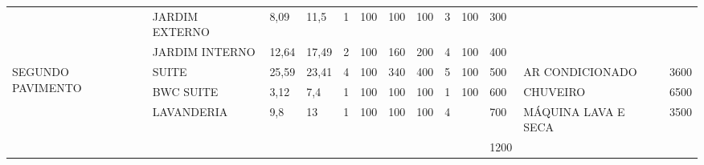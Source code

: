 \begin{table}[H]
{\begin{tabular}{|l|l|ll|llll|lll|ll|}
		& JARDIM EXTERNO               & \multicolumn{1}{l|}{8,09}                   & 11,5                   & \multicolumn{1}{l|}{1}                  & \multicolumn{1}{l|}{100}                  & \multicolumn{1}{l|}{100}                  & 100                  & \multicolumn{1}{l|}{3}                  & \multicolumn{1}{l|}{100}                  & 300                   & \multicolumn{1}{l|}{}                     &          \\ \cline{2-13} 
		& JARDIM INTERNO               & \multicolumn{1}{l|}{12,64}                  & 17,49                  & \multicolumn{1}{l|}{2}                  & \multicolumn{1}{l|}{100}                  & \multicolumn{1}{l|}{160}                  & 200                  & \multicolumn{1}{l|}{4}                  & \multicolumn{1}{l|}{100}                  & 400                   & \multicolumn{1}{l|}{}                     &          \\ \hline
		\multirow{13}{*}{SEGUNDO PAVIMENTO} & SUITE                        & \multicolumn{1}{l|}{25,59}                  & 23,41                  & \multicolumn{1}{l|}{4}                  & \multicolumn{1}{l|}{100}                  & \multicolumn{1}{l|}{340}                  & 400                  & \multicolumn{1}{l|}{5}                  & \multicolumn{1}{l|}{100}                  & 500                   & \multicolumn{1}{l|}{AR CONDICIONADO}      & 3600     \\ \cline{2-13} 
		& BWC SUITE                    & \multicolumn{1}{l|}{3,12}                   & 7,4                    & \multicolumn{1}{l|}{1}                  & \multicolumn{1}{l|}{100}                  & \multicolumn{1}{l|}{100}                  & 100                  & \multicolumn{1}{l|}{1}                  & \multicolumn{1}{l|}{100}                  & 600                   & \multicolumn{1}{l|}{CHUVEIRO}             & 6500     \\ \cline{2-13} 
		& \multirow{2}{*}{LAVANDERIA}  & \multicolumn{1}{l|}{\multirow{2}{*}{9,8}}   & \multirow{2}{*}{13}    & \multicolumn{1}{l|}{\multirow{2}{*}{1}} & \multicolumn{1}{l|}{\multirow{2}{*}{100}} & \multicolumn{1}{l|}{\multirow{2}{*}{100}} & \multirow{2}{*}{100} & \multicolumn{1}{l|}{\multirow{2}{*}{4}} & \multicolumn{1}{l|}{}                     & 700                   & \multicolumn{1}{l|}{MÁQUINA LAVA E SECA}  & 3500     \\ \cline{10-13} 
		&                              & \multicolumn{1}{l|}{}                       &                        & \multicolumn{1}{l|}{}                   & \multicolumn{1}{l|}{}                     & \multicolumn{1}{l|}{}                     &                      & \multicolumn{1}{l|}{}                   & \multicolumn{1}{l|}{}                     & 1200                  & \multicolumn{1}{l|}{}                     &          \\ \cline{2-13} 

\end{tabular}}
\end{table}
